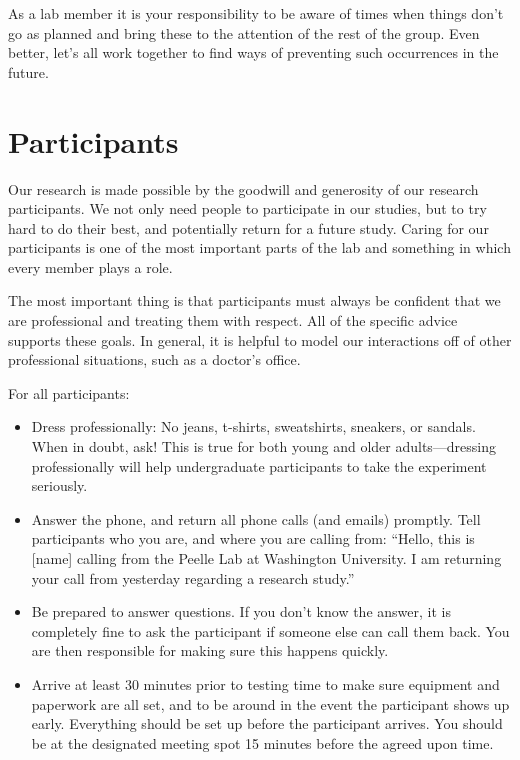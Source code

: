 \documentclass[letterpaper,12pt,oneside]{memoir}
\begin{document}
As a lab member it is your responsibility to be aware of times when things don't go as planned and bring these to the attention of the rest of the group. Even better, let's all work together to find ways of preventing such occurrences in the future.



\section{Participants}
\label{sec:participants}

Our research is made possible by the goodwill and generosity of our research participants. We not only need people to participate in our studies, but to try hard to do their best, and potentially return for a future study. Caring for our participants is one of the most important parts of the lab and something in which every member plays a role.

The most important thing is that participants must always be confident that we are professional and treating them with respect. All of the specific advice supports these goals. In general, it is helpful to model our interactions off of other professional situations, such as a doctor's office.

For all participants:

\begin{itemize}
\item Dress professionally: No jeans, t-shirts, sweatshirts, sneakers, or sandals. When in doubt, ask! This is true for both young and older adults---dressing professionally will help undergraduate participants to take the experiment seriously.
\item Answer the phone, and return all phone calls (and emails) promptly. Tell participants who you are, and where you are calling from: ``Hello, this is [name] calling from the Peelle Lab at Washington University. I am returning your call from yesterday regarding a research study.''
\item Be prepared to answer questions. If you don't know the answer, it is completely fine to ask the participant if someone else can call them back. You are then responsible for making sure this happens quickly.
\item Arrive at least 30 minutes prior to testing time to make sure equipment and paperwork are all set, and to be around in the event the participant shows up early. Everything should be set up before the participant arrives. You should be at the designated meeting spot 15 minutes before the agreed upon time.
\end{itemize}
	
\end{document}
